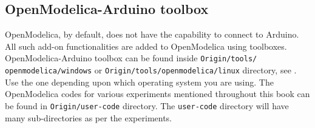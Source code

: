 \subsection{OpenModelica-Arduino toolbox}\label{sec:load-om-toolbox}
OpenModelica, by default, does not have the capability to connect to Arduino. 
All such add-on functionalities are added to OpenModelica using toolboxes.  
OpenModelica-Arduino toolbox can be found inside {\tt Origin/tools/\\openmodelica/windows} or {\tt Origin/tools/openmodelica/linux} directory,
see .  Use the one depending upon
which operating system you are using. The OpenModelica codes for various
experiments mentioned throughout this book can be found in {\tt Origin/user-code} directory. The {\tt user-code} directory will have
many sub-directories as per the experiments. 

